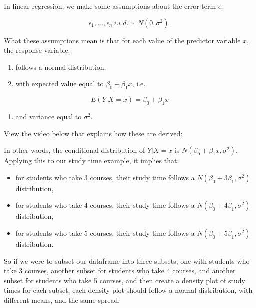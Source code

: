 \documentclass[
]{book}
\providecommand{\tightlist}{%
  \setlength{\itemsep}{0pt}\setlength{\parskip}{0pt}}
\begin{document}
In linear regression, we make some assumptions about the error term \(\epsilon\):

\begin{equation} 
\epsilon_1,\ldots,\epsilon_n \ i.i.d. \sim N(0,\sigma^2).
\label{eq:10-assumptions}
\end{equation}

What these assumptions mean is that for each value of the predictor variable \(x\), the response variable:

\begin{enumerate}
\def\labelenumi{\arabic{enumi}.}
\tightlist
\item
  follows a normal distribution,
\item
  with expected value equal to \(\beta_0+\beta_{1} x\), i.e.
\end{enumerate}

\begin{equation} 
E(Y|X=x) = \beta_0+\beta_{1} x 
\label{eq:10-SLR}
\end{equation}

\begin{enumerate}
\def\labelenumi{\arabic{enumi}.}
\setcounter{enumi}{2}
\tightlist
\item
  and variance equal to \(\sigma^2\).
\end{enumerate}

View the video below that explains how these are derived:

In other words, the conditional distribution of \(Y|X=x\) is \(N(\beta_0+\beta_{1} x, \sigma^2)\). Applying this to our study time example, it implies that:

\begin{itemize}
\tightlist
\item
  for students who take 3 courses, their study time follows a \(N(\beta_0 + 3\beta_1, \sigma^2)\) distribution,
\item
  for students who take 4 courses, their study time follows a \(N(\beta_0 + 4\beta_1, \sigma^2)\) distribution,
\item
  for students who take 5 courses, their study time follows a \(N(\beta_0 + 5\beta_1, \sigma^2)\) distribution.
\end{itemize}

So if we were to subset our dataframe into three subsets, one with students who take 3 courses, another subset for students who take 4 courses, and another subset for students who take 5 courses, and then create a density plot of study times for each subset, each density plot should follow a normal distribution, with different means, and the same spread.
\end{document}
